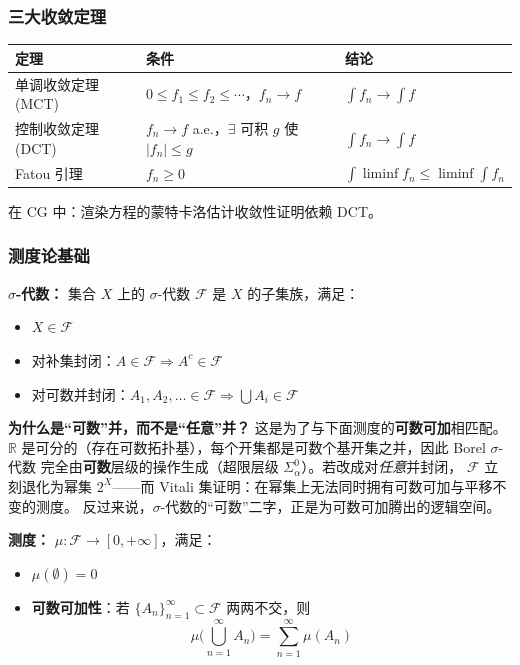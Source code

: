 \subsubsection{三大收敛定理}

\begin{center}
\begin{tabular}{p{3.5cm}p{5cm}p{4cm}}
\toprule
\textbf{定理} & \textbf{条件} & \textbf{结论} \\
\midrule
单调收敛定理 (MCT) & $0 \leq f_1 \leq f_2 \leq \cdots$，$f_n \to f$ & $\int f_n \to \int f$ \\
控制收敛定理 (DCT) & $f_n \to f$ a.e.，$\exists$ 可积 $g$ 使 $|f_n| \leq g$ & $\int f_n \to \int f$ \\
Fatou 引理 & $f_n \geq 0$ & $\int \liminf f_n \leq \liminf \int f_n$ \\
\bottomrule
\end{tabular}
\end{center}

在 CG 中：渲染方程的蒙特卡洛估计收敛性证明依赖 DCT。

\subsubsection{测度论基础}

\textbf{$\sigma$-代数：} 集合 $X$ 上的 $\sigma$-代数 $\mathcal{F}$ 是 $X$ 的子集族，满足：
\begin{itemize}
  \item $X \in \mathcal{F}$
  \item 对补集封闭：$A \in \mathcal{F} \Rightarrow A^c \in \mathcal{F}$
  \item 对可数并封闭：$A_1, A_2, \ldots \in \mathcal{F} \Rightarrow \bigcup A_i \in \mathcal{F}$
\end{itemize}

\textbf{为什么是“可数”并，而不是“任意”并？} 这是为了与下面测度的\textbf{可数可加}相匹配。
$\mathbb{R}$ 是可分的（存在可数拓扑基），每个开集都是可数个基开集之并，因此 Borel $\sigma$-代数
完全由\textbf{可数}层级的操作生成（超限层级 $\Sigma^0_\alpha$）。若改成对\emph{任意}并封闭，
$\mathcal{F}$ 立刻退化为幂集 $2^X$——而 Vitali 集证明：在幂集上无法同时拥有可数可加与平移不变的测度。
反过来说，$\sigma$-代数的“可数”二字，正是为可数可加腾出的逻辑空间。

\textbf{测度：} $\mu: \mathcal{F} \to [0, +\infty]$，满足：
\begin{itemize}
  \item $\mu(\emptyset) = 0$
  \item \textbf{可数可加性}：若 $\{A_n\}_{n=1}^\infty \subset \mathcal{F}$ 两两不交，则
  \[
  \mu\Big(\bigcup_{n=1}^\infty A_n\Big) = \sum_{n=1}^\infty \mu(A_n)
  \]
\end{itemize}

